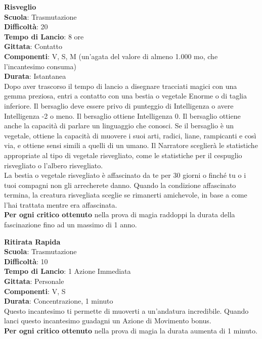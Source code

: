 \begin{multicols}{2}
\medskip\textbf{Risveglio}\\
\textbf{Scuola}: Trasmutazione\\
\textbf{Difficoltà}: 20\\
\textbf{Tempo di Lancio}: 8 ore\\
\textbf{Gittata}: Contatto\\
\textbf{Componenti}: V, S, M (un'agata del valore di almeno 1.000 mo, che l'incantesimo consuma)\\
\textbf{Durata}: Istantanea\\
Dopo aver trascorso il tempo di lancio a disegnare tracciati magici con una gemma preziosa, entri a contatto con una bestia o vegetale Enorme o di taglia inferiore. Il bersaglio deve essere privo di punteggio di Intelligenza o avere Intelligenza -2 o meno. Il bersaglio ottiene Intelligenza 0. Il bersaglio ottiene anche la capacità di parlare un linguaggio che conosci. Se il bersaglio è un vegetale, ottiene la capacità di muovere i suoi arti, radici, liane, rampicanti e così via, e ottiene sensi simili a quelli di un umano. Il Narratore sceglierà le statistiche appropriate al tipo di vegetale risvegliato, come le statistiche per il cespuglio risvegliato o l'albero risvegliato.\\
La bestia o vegetale risvegliato è affascinato da te per 30 giorni o finché tu o i tuoi compagni non gli arrecherete danno. Quando la condizione affascinato termina, la creatura risvegliata sceglie se rimanerti amichevole, in base a come l'hai trattata mentre era affascinata.\\
\textbf{Per ogni critico ottenuto} nella prova di magia raddoppi la durata della fascinazione fino ad un massimo di 1 anno.

\medskip\textbf{Ritirata Rapida}\\
\textbf{Scuola}: Trasmutazione\\
\textbf{Difficoltà}: 10\\
\textbf{Tempo di Lancio}: 1 Azione Immediata\\
\textbf{Gittata}: Personale\\
\textbf{Componenti}: V, S\\
\textbf{Durata}: Concentrazione, 1 minuto\\
Questo incantesimo ti permette di muoverti a un'andatura incredibile. Quando lanci questo incantesimo guadagni un Azione di Movimento bonus.\\
\textbf{Per ogni critico ottenuto} nella prova di magia la durata aumenta di 1 minuto.


\end{multicols}
